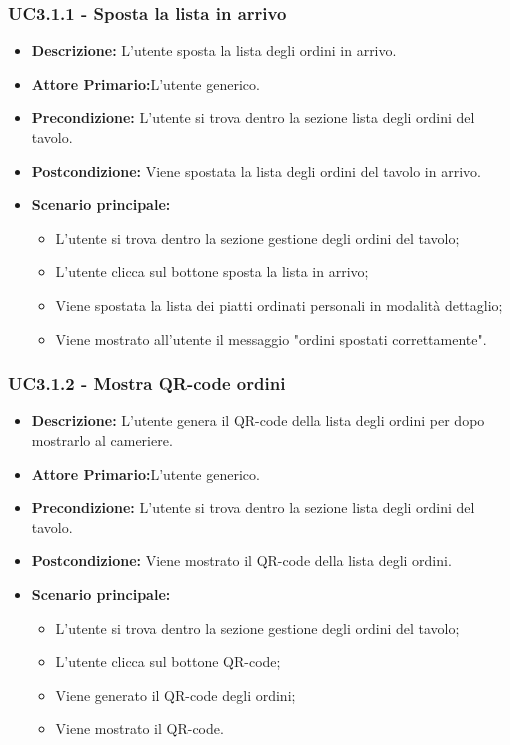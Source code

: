 \subsubsection{UC3.1.1 - Sposta la lista in arrivo}
\begin{itemize}
    \item \textbf{Descrizione:} L'utente sposta la lista degli ordini in arrivo.
    \item \textbf{Attore Primario:}L'utente generico.
    \item \textbf{Precondizione:} L'utente si trova dentro la sezione lista degli ordini del tavolo.
    \item \textbf{Postcondizione:} Viene spostata la lista degli ordini del tavolo in arrivo.
    \item \textbf{Scenario principale:}
    \begin{itemize}
        \item L'utente si trova dentro la sezione gestione degli ordini del tavolo;
        \item L'utente clicca sul bottone sposta la lista in arrivo;
        \item Viene spostata la lista dei piatti ordinati personali in modalità dettaglio;
        \item Viene mostrato all'utente il messaggio "ordini spostati correttamente".
    \end{itemize}
\end{itemize}
\subsubsection{UC3.1.2 - Mostra QR-code ordini}
\begin{itemize}
    \item \textbf{Descrizione:} L'utente genera il QR-code della lista degli ordini per dopo mostrarlo al cameriere.
    \item \textbf{Attore Primario:}L'utente generico.
    \item \textbf{Precondizione:} L'utente si trova dentro la sezione lista degli ordini del tavolo.
    \item \textbf{Postcondizione:} Viene mostrato il QR-code della lista degli ordini.
    \item \textbf{Scenario principale:}
    \begin{itemize}
        \item L'utente si trova dentro la sezione gestione degli ordini del tavolo;
        \item L'utente clicca sul bottone QR-code;
        \item Viene generato il QR-code degli ordini;
        \item Viene mostrato il QR-code.
    \end{itemize}
\end{itemize}
